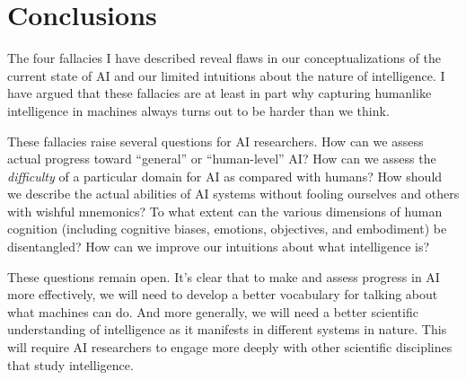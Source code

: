 \documentclass[12pt]{article}
\begin{document}
\section*{Conclusions}

The four fallacies I have described reveal flaws in our conceptualizations of the current state of AI and our limited intuitions about the nature of intelligence.  I have argued that these fallacies are at least in part why capturing humanlike intelligence in machines always turns out to be harder than we think.

These fallacies raise several questions for AI researchers. How can we assess actual progress toward ``general'' or ``human-level'' AI?  How can we assess the \textit{difficulty} of a particular domain for AI as compared with humans?  How should we describe the actual abilities of AI systems without fooling ourselves and others with wishful mnemonics?  To what extent can the various dimensions of human cognition (including cognitive biases, emotions, objectives, and embodiment) be disentangled?  How can we improve our intuitions about what intelligence is?

These questions remain open.  It's clear that to make and assess progress in AI more effectively, we will need to develop a better vocabulary for talking about what machines can do.  And more generally, we will need a better scientific understanding of intelligence as it manifests in different systems in nature.  This will require AI researchers to engage more deeply with other scientific disciplines that study intelligence.  
\end{document}
